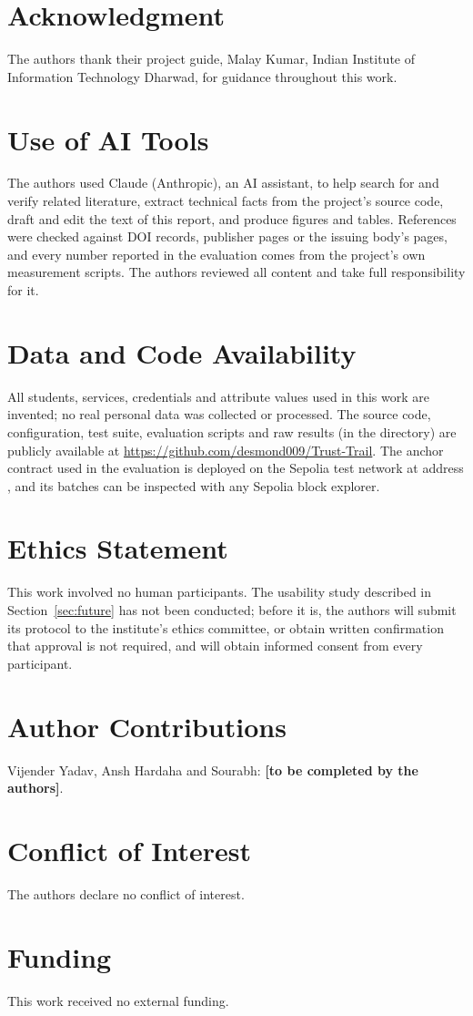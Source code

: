 \section*{Acknowledgment}
The authors thank their project guide, Malay Kumar, Indian Institute of Information Technology Dharwad, for guidance throughout this work.

\section*{Use of AI Tools}
The authors used Claude (Anthropic), an AI assistant, to help search for and verify related literature, extract technical facts from the project's source code, draft and edit the text of this report, and produce figures and tables. References were checked against DOI records, publisher pages or the issuing body's pages, and every number reported in the evaluation comes from the project's own measurement scripts. The authors reviewed all content and take full responsibility for it.

\section*{Data and Code Availability}
All students, services, credentials and attribute values used in this work are invented; no real personal data was collected or processed. The source code, configuration, test suite, evaluation scripts and raw results (in the  directory) are publicly available at \url{https://github.com/desmond009/Trust-Trail}. The anchor contract used in the evaluation is deployed on the Sepolia test network at address , and its batches can be inspected with any Sepolia block explorer.

\section*{Ethics Statement}
This work involved no human participants. The usability study described in Section~\ref{sec:future} has not been conducted; before it is, the authors will submit its protocol to the institute's ethics committee, or obtain written confirmation that approval is not required, and will obtain informed consent from every participant.

\section*{Author Contributions}
Vijender Yadav, Ansh Hardaha and Sourabh: \textbf{[to be completed by the authors]}.

\section*{Conflict of Interest}
The authors declare no conflict of interest.

\section*{Funding}
This work received no external funding.
